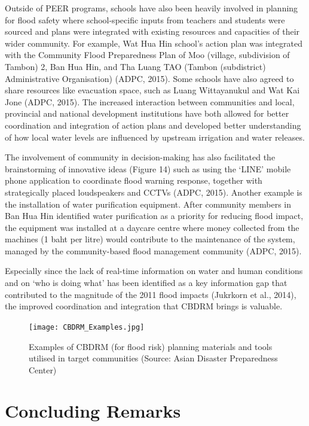 Outside of PEER programs, schools have also been heavily involved in planning for flood safety where school-specific inputs from teachers and students were sourced and plans were integrated with existing resources and capacities of their wider community. For example, Wat Hua Hin school's action plan was integrated with the Community Flood Preparedness Plan of Moo (village, subdivision of Tambon) 2, Ban Hua Hin, and Tha Luang TAO (Tambon (subdistrict) Administrative Organisation) (ADPC, 2015). Some schools have also agreed to share resources like evacuation space, such as Luang Wittayanukul and Wat Kai Jone (ADPC, 2015). The increased interaction between communities and local, provincial and national development institutions have both allowed for better coordination and integration of action plans and developed better understanding of how local water levels are influenced by upstream irrigation and water releases.

The involvement of community in decision-making has also facilitated the brainstorming of innovative ideas (Figure 14) such as using the ‘LINE' mobile phone application to coordinate flood warning response, together with strategically placed loudspeakers and CCTVs (ADPC, 2015). Another example is the installation of water purification equipment. After community members in Ban Hua Hin identified water purification as a priority for reducing flood impact, the equipment was installed at a daycare centre where money collected from the machines (1 baht per litre) would contribute to the maintenance of the system, managed by the community-based flood management community (ADPC, 2015).  

Especially since the lack of real-time information on water and human conditions and on ‘who is doing what' has been identified as a key information gap that contributed to the magnitude of the 2011 flood impacts (Jukrkorn et al., 2014), the improved coordination and integration that CBDRM brings is valuable. 

\begin{figure}[htb]
	\centering
		\texttt{[image: CBDRM\_Examples.jpg]}
	\caption{Examples of CBDRM (for flood risk) planning materials and tools utilised in target communities  (Source: Asian Disaster Preparedness Center)}
	\label{fig:CBDRM_Examples}
\end{figure}

\section{Concluding Remarks}

